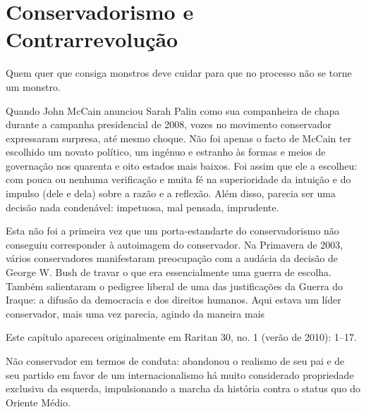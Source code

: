 \chapter{Conservadorismo e Contrarrevolução}\label{Conservadorismo e Contrarrevolução}
 \par 
Quem quer que consiga monstros deve cuidar para que no processo não se torne um monstro.
 \par 
Quando John McCain anunciou Sarah Palin como sua companheira de chapa durante a campanha presidencial de 2008, vozes no movimento conservador expressaram surpresa, até mesmo choque. Não foi apenas o facto de McCain ter escolhido um novato político, um ingénuo e estranho às formas e meios de governação nos quarenta e oito estados mais baixos. Foi assim que ele a escolheu: com pouca ou nenhuma verificação e muita fé na superioridade da intuição e do impulso (dele e dela) sobre a razão e a reflexão. Além disso, parecia ser uma decisão nada condenável: impetuosa, mal pensada, imprudente.
 \par 
Esta não foi a primeira vez que um porta-estandarte do conservadorismo não conseguiu corresponder à autoimagem do conservador. Na Primavera de 2003, vários conservadores manifestaram preocupação com a audácia da decisão de George W. Bush de travar o que era essencialmente uma guerra de escolha. Também salientaram o pedigree liberal de uma das justificações da Guerra do Iraque: a difusão da democracia e dos direitos humanos. Aqui estava um líder conservador, mais uma vez parecia, agindo da maneira mais
 \par 
Este capítulo apareceu originalmente em Raritan 30, no. {\color{blue}1} (verão de 2010): 1–17.
 \par 
Não conservador em termos de conduta: abandonou o realismo de seu pai e de seu partido em favor de um internacionalismo há muito considerado propriedade exclusiva da esquerda, impulsionando a marcha da história contra o status quo do Oriente Médio.
 \par 
